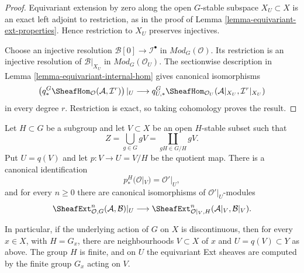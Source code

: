 \begin{proof}
Equivariant extension by zero along the open $G$-stable subspace
$X_U\subset X$ is an exact left adjoint to restriction, as in the proof of
Lemma \ref{lemma-equivariant-ext-properties}. Hence restriction to $X_U$
preserves injectives.

Choose an injective resolution $\mathcal B[0]\to\mathcal I^\bullet$ in
$\textit{Mod}_G(\mathcal O)$. Its restriction is an injective resolution of
$\mathcal B|_{X_U}$ in $\textit{Mod}_G(\mathcal O_U)$. The sectionwise
description in Lemma \ref{lemma-equivariant-internal-hom} gives canonical
isomorphisms
$$
\left(
q_*^G\SheafHom_{\mathcal O}(\mathcal A,\mathcal I^r)
\right)|_U
\longrightarrow
q_{U,*}^G\SheafHom_{\mathcal O_U}
(\mathcal A|_{X_U},\mathcal I^r|_{X_U})
$$
in every degree $r$. Restriction is exact, so taking cohomology proves the
result.
\end{proof}

\begin{lemma}
\label{lemma-equivariant-ext-slice}
\begin{reference}
\cite[Chapter V, \S 5.6, following formula (5.6.8), p. 214]{Tohoku}
\end{reference}
Let $H\subset G$ be a subgroup and let $V\subset X$ be an open $H$-stable
subset such that
$$
Z=\bigcup_{g\in G}gV
=
\coprod_{gH\in G/H}gV.
$$
Put $U=q(V)$ and let $p:V\to U=V/H$ be the quotient map. There is a
canonical identification
$$
p_*^H(\mathcal O|_V)=\mathcal O'|_U,
$$
and for every $n\geq 0$ there are canonical isomorphisms of
$\mathcal O'|_U$-modules
$$
\SheafExt^n_{\mathcal O,G}(\mathcal A,\mathcal B)|_U
\longrightarrow
\SheafExt^n_{\mathcal O|_V,H}
(\mathcal A|_V,\mathcal B|_V).
$$

In particular, if the underlying action of $G$ on $X$ is discontinuous,
then for every $x\in X$, with $H=G_x$, there are neighbourhoods
$V\subset X$ of $x$ and $U=q(V)\subset Y$ as above. The group $H$ is
finite, and on $U$ the equivariant Ext sheaves are computed by the finite
group $G_x$ acting on $V$.
\end{lemma}

